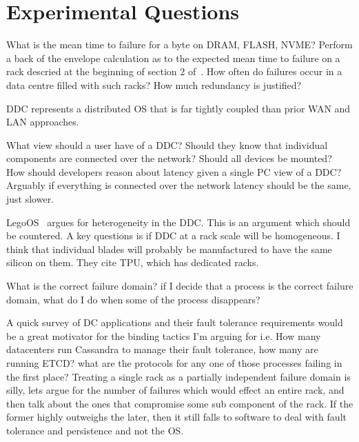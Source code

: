 

\section{Experimental Questions}
\label{sec:experiment}

What is the mean time to failure for a byte on DRAM, FLASH, NVME? Perform a
back of the envelope calculation as to the expected mean time to failure on a
rack descried at the beginning of section 2 of~\cite{189914}. How often do
failures occur in a data centre filled with such racks? How much redundancy is
justified?

DDC represents a distributed OS that is far tightly coupled than prior WAN and
LAN approaches.

What view should a user have of a DDC? Should they know that individual
components are connected over the network? Should all devices be mounted? How
should developers reason about latency given a single PC view of a DDC?
Arguably if everything is connected over the network latency should be the
same, just slower.

LegoOS~\cite{legoos} argues for heterogeneity in the DDC. This is an argument
which should be countered. A key questions is if DDC at a rack scale will be
homogeneous. I think that individual blades will probably be manufactured to
have the same silicon on them. They cite TPU, which has dedicated racks.

What is the correct failure domain? if I decide that a process is the correct
failure domain, what do I do when some of the process disappears? 

A quick survey of DC applications and their fault tolerance requirements would
be a great motivator for the binding tactics I'm arguing for i.e. How many
datacenters run Cassandra to manage their fault tolerance, how many are
running ETCD? what are the protocols for any one of those processes failing in
the first place? Treating a single rack as a partially independent failure
domain is silly, lets argue for the number of failures which would effect an
entire rack, and then talk about the ones that compromise some sub component of
the rack. If the former highly outweighs the later, then it still falls to
software to deal with fault tolerance and persistence and not the OS.

